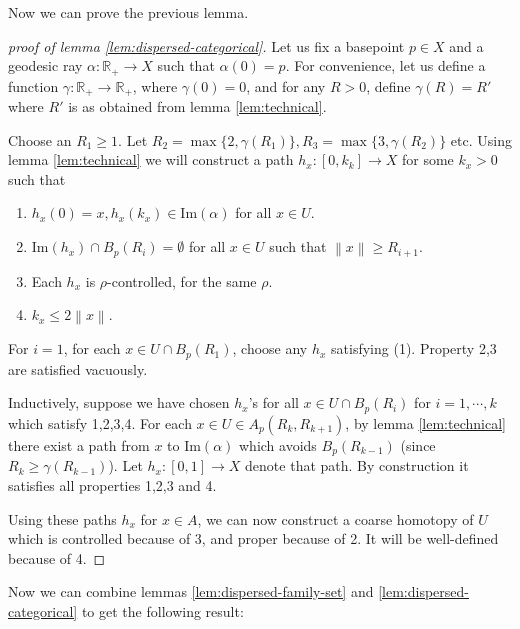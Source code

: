\documentclass {amsart}
\newcommand {\Rplus}    {\mathbb{R}_{+}}
\newcommand {\im}       {\text{Im}}
\newcommand {\norm} [1] {\left\| #1 \right\|}
\newcommand {\adi}  [1] {\textcolor{blue}{Adi: #1}}
\theoremstyle {definition}
\begin{document}
Now we can prove the previous lemma.
\begin{proof}
[proof of lemma \ref{lem:dispersed-categorical}]

Let us fix a basepoint \( p \in X \) and a geodesic ray \( \alpha : \Rplus \to
X\) such that \( \alpha(0) = p \). For convenience, let us define a function \(
\gamma : \Rplus \to \Rplus \), where \( \gamma(0) = 0 \), and for any \( R >
0\), define \( \gamma (R) = R' \) where \( R' \) is as obtained from lemma
\ref{lem:technical}.

Choose an \( R_1 \geq 1 \). Let \( R_2 = \max \{ 2, \gamma(R_1) \}, R_3 = \max
\{ 3, \gamma(R_2) \} \) etc. Using lemma \ref{lem:technical} we will construct
a path \( h_x : [0,k_k] \to X \) for some \( k_x > 0 \) such that
\begin{enumerate}
    \item \( h_x(0) = x, h_x(k_x) \in \im (\alpha) \) for all \( x \in U \).
    \item \( \im (h_x) \cap B _{p} (R_i) = \emptyset\) for all \( x \in U \) such
          that \( \norm x \geq R_{i+1}\).
    \item Each \( h_x \) is \( \rho \)-controlled, for the same \( \rho \).
  \item \( k_x \leq 2 \norm x \).
\end{enumerate}

For \( i=1 \), for each \( x \in U \cap B _{p} (R_1) \), choose any \( h_x \)
satisfying (1). Property 2,3 are satisfied vacuously.

Inductively, suppose we have chosen \( h_x \)'s for all \( x \in U \cap B _{p}
(R_i) \) for \( i = 1, \cdots, k \) which satisfy 1,2,3,4. For each \( x \in U \in
A_p (R_k, R_{k+1})\), by lemma \ref{lem:technical} there exist a path from \(
x\) to \( \im(\alpha) \) which avoids \( B _{p} (R_{k-1}) \) (since \( R_k \geq
\gamma(R_{k-1}) \)). Let \( h_x : [0,1] \to X \) denote that path. By
construction it satisfies all properties 1,2,3 and 4.

Using these paths \( h_x \) for \( x \in A \), we can now construct a coarse
homotopy of \( U \) which is controlled because of 3, and proper because of
2. It will be well-defined because of 4.


\end{proof}

Now we can combine lemmas \ref{lem:dispersed-family-set} and
\ref{lem:dispersed-categorical} to get the following result:
\end{document}
